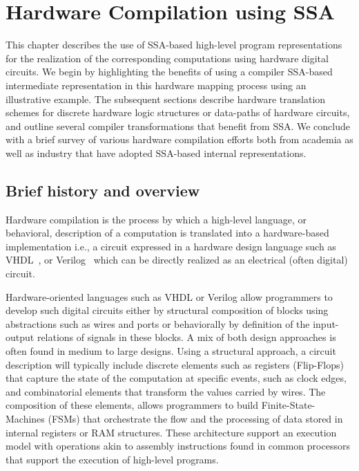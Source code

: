 \chapter{Hardware Compilation using SSA
}
\label{chapter:hardware_compilation}

This chapter describes the use of SSA-based high-level program representations for the realization of the corresponding computations using hardware digital circuits. 
  We begin by highlighting the benefits of using a compiler SSA-based intermediate representation in this hardware mapping process using an illustrative example. 
  The subsequent sections describe hardware translation schemes for discrete hardware logic structures or data-paths of hardware circuits, and outline several compiler transformations that benefit from SSA.  We conclude with a brief survey of various hardware compilation efforts both from academia as well as industry that have adopted SSA-based internal representations.


\renewcommand{\comment}[1]{}

\section{Brief history and overview}

Hardware compilation is the process by which a high-level language, or behavioral, description of a computation is translated into a hardware-based implementation i.e., a circuit expressed in a hardware design language such as VHDL~\cite{VHDLBook}, or Verilog~\cite{VerilogBook} which can be directly realized as an electrical (often digital) circuit. 

Hardware-oriented languages such as VHDL or Verilog allow programmers to develop such digital circuits either by structural composition of blocks using abstractions such as wires and ports or behaviorally  by definition of the input-output relations of signals in these blocks. A mix of both design approaches is often found in medium to large designs. 
Using a structural  approach, a circuit description  will typically include discrete elements such as registers (Flip-Flops) that capture the state of the computation at specific events, such as clock edges, and combinatorial elements that transform the values carried by wires. The composition of these elements, allows programmers to build Finite-State-Machines (FSMs) that orchestrate the flow and the processing of data stored in internal registers or RAM structures. These architecture support an execution model  with operations akin to assembly instructions found in common processors that support the execution of high-level programs.

